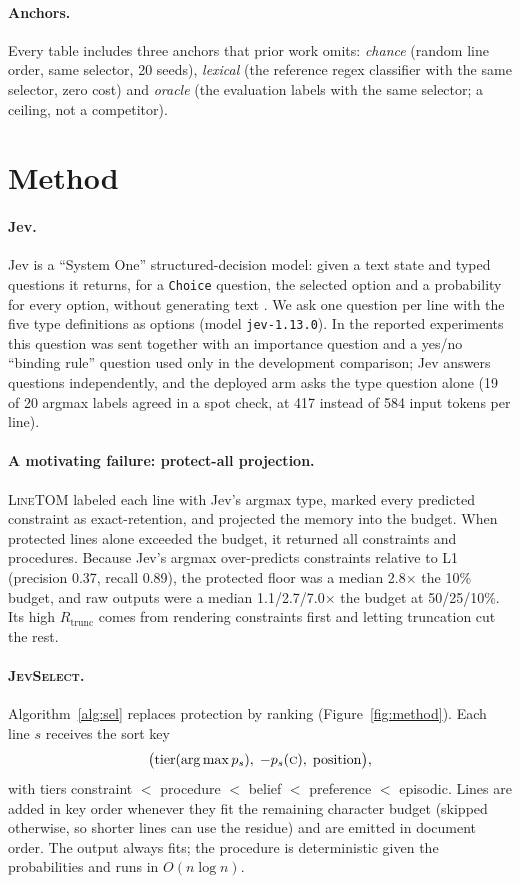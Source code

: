 \documentclass[11pt,a4paper]{article}
\newcommand{\sel}{\textsc{JevSelect}}
\newcommand{\linetom}{\textsc{LineTOM}}
\newcommand{\Rt}{R_{\mathrm{trunc}}}
\begin{document}
\paragraph{Anchors.} Every table includes three anchors that prior work omits: \emph{chance} (random line order, same selector, 20 seeds), \emph{lexical} (the reference regex classifier with the same selector, zero cost) and \emph{oracle} (the evaluation labels with the same selector; a ceiling, not a competitor).

\section{Method}\label{sec:method}
\paragraph{Jev.} Jev is a ``System One'' structured-decision model: given a text state and typed questions it returns, for a \texttt{Choice} question, the selected option and a probability for every option, without generating text \citep{typesafe2026jev}. We ask one question per line with the five type definitions as options (model \texttt{jev-1.13.0}). In the reported experiments this question was sent together with an importance question and a yes/no ``binding rule'' question used only in the development comparison; Jev answers questions independently, and the deployed arm asks the type question alone (19 of 20 argmax labels agreed in a spot check, at 417 instead of 584 input tokens per line).

\paragraph{A motivating failure: protect-all projection.} \linetom{} labeled each line with Jev's argmax type, marked every predicted constraint as exact-retention, and projected the memory into the budget. When protected lines alone exceeded the budget, it returned all constraints and procedures. Because Jev's argmax over-predicts constraints relative to L1 (precision 0.37, recall 0.89), the protected floor was a median 2.8$\times$ the 10\% budget, and raw outputs were a median 1.1/2.7/7.0$\times$ the budget at 50/25/10\%. Its high $\Rt$ comes from rendering constraints first and letting truncation cut the rest.

\paragraph{\sel{}.} Algorithm~\ref{alg:sel} replaces protection by ranking (Figure~\ref{fig:method}). Each line $s$ receives the sort key
\[
\bigl(\mathrm{tier}(\textstyle\arg\max p_s),\; -p_s(\textsc{c}),\; \mathrm{position}\bigr),
\]
with tiers constraint $<$ procedure $<$ belief $<$ preference $<$ episodic. Lines are added in key order whenever they fit the remaining character budget (skipped otherwise, so shorter lines can use the residue) and are emitted in document order. The output always fits; the procedure is deterministic given the probabilities and runs in $O(n\log n)$.
\end{document}
